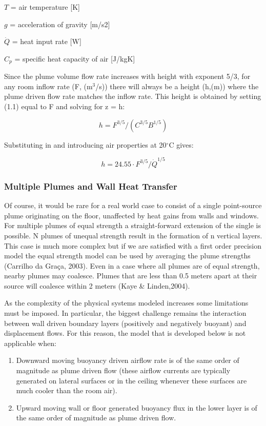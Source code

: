\(T\) = air temperature {[}K{]}

\(g\) = acceleration of gravity {[}m/s2{]}

\(\dot Q\) = heat input rate {[}W{]}

\({C_p}\) = specific heat capacity of air {[}J/kgK{]}

Since the plume volume flow rate increases with height with exponent 5/3, for any room inflow rate (F, (m\(^{3}\)/s)) there will always be a height (h,(m)) where the plume driven flow rate matches the inflow rate. This height is obtained by setting (1.1) equal to F and solving for z = h:

\begin{equation}
h = {F^{3/5}}/({C^{3/5}}{B^{1/5}})
\end{equation}

Substituting in and introducing air properties at 20\(^{\circ}\)C gives:

\begin{equation}
h = 24.55\cdot {F^{3/5}}/{\dot Q^{1/5}}
\end{equation}

\subsubsection{Multiple Plumes and Wall Heat Transfer}\label{multiple-plumes-and-wall-heat-transfer}

Of course, it would be rare for a real world case to consist of a single point-source plume originating on the floor, unaffected by heat gains from walls and windows. For multiple plumes of equal strength a straight-forward extension of the single is possible. N plumes of unequal strength result in the formation of n vertical layers. This case is much more complex but if we are satisfied with a first order precision model the equal strength model can be used by averaging the plume strengths (Carrilho da Graça, 2003). Even in a case where all plumes are of equal strength, nearby plumes may coalesce. Plumes that are less than 0.5 meters apart at their source will coalesce within 2 meters (Kaye \& Linden,2004).

As the complexity of the physical systems modeled increases some limitations must be imposed. In particular, the biggest challenge remains the interaction between wall driven boundary layers (positively and negatively buoyant) and displacement flows. For this reason, the model that is developed below is not applicable when:

\begin{enumerate}
\item Downward moving buoyancy driven airflow rate is of the same order of magnitude as plume driven flow (these airflow currents are typically generated on lateral surfaces or in the ceiling whenever these surfaces are much cooler than the room air).
\item Upward moving wall or floor generated buoyancy flux in the lower layer is of the same order of magnitude as plume driven flow.
\end{enumerate}

